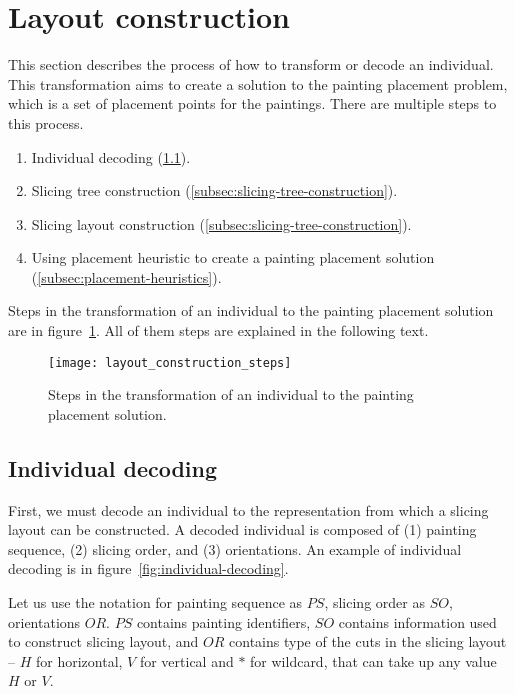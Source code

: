 \newpage
\section{Layout construction}\label{sec:layout-construction}

This section describes the process of how to transform or decode an individual.
This transformation aims to create a solution to the painting placement problem,
which is a set of placement points for the paintings.
There are multiple steps to this process.

\begin{enumerate}
    \item Individual decoding (\ref{subsec:individual-decoding}).
    \item Slicing tree construction (\ref{subsec:slicing-tree-construction}).
    \item Slicing layout construction (\ref{subsec:slicing-tree-construction}).
    \item Using placement heuristic to create a painting placement solution (\ref{subsec:placement-heuristics}).
\end{enumerate}

Steps in the transformation of an individual to the painting placement solution are
in figure~\ref{fig:layout-construction-steps}.
All of them steps are explained in the following text.

\begin{figure}[h!]
    \texttt{[image: layout\_construction\_steps]}
    \caption{Steps in the transformation of an individual to the painting placement solution.}
    \label{fig:layout-construction-steps}
\end{figure}

\subsection{Individual decoding}\label{subsec:individual-decoding}
First, we must decode an individual to the representation from which a slicing layout can be constructed.
A decoded individual is composed of (1) painting sequence, (2) slicing order, and (3) orientations.
An example of individual decoding is in figure~\ref{fig:individual-decoding}.

Let us use the notation for painting sequence as $PS$, slicing order as $SO$, orientations $OR$.
$PS$ contains painting identifiers, $SO$ contains information used to construct slicing layout,
and $OR$ contains type of the cuts in the slicing layout – $H$ for horizontal, $V$ for vertical
and $*$ for wildcard, that can take up any value $H$ or $V$.

